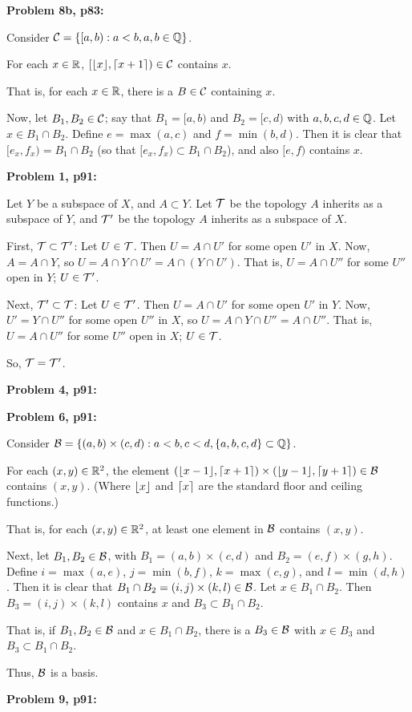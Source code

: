 \documentclass[a4paper,12pt]{article}
\begin{document}
\shunt

{\bf Problem 8b, p83:}

Consider $\mathcal{C} = \{[a,b): a<b, a, b \in \mathbb{Q}\}$.

For each $x \in \mathbb{R}$, $[\lfloor x\rfloor,\lceil x+1\rceil) \in \mathcal{C}$ contains $x$.

That is, for each $x \in \mathbb{R}$, there is a $B \in \mathcal{C}$ containing $x$.

Now, let $B_1, B_2 \in \mathcal{C}$; say that $B_1 = [a,b)$ and $B_2 = [c,d)$ with $a,b,c,d \in \mathbb{Q}$. Let $x \in B_1 \cap B_2$. Define $e = \max(a,c)$ and $f = \min(b,d)$. Then it is clear that $[e_x,f_x) = B_1 \cap B_2$ (so that $[e_x,f_x) \subset B_1 \cap B_2$), and also $[e,f)$ contains $x$. 


\shunt

{\bf Problem 1, p91:}

Let $Y$ be a subspace of $X$, and $A \subset Y$. Let $\mathcal{T}$ be the topology $A$ inherits as a subspace of $Y$, and $\mathcal{T}'$ be the topology $A$ inherits as a subspace of $X$.

First, $\mathcal{T} \subset \mathcal{T}'$: Let $U \in \mathcal{T}$. Then $U = A \cap U'$ for some open $U'$ in $X$. Now, $A = A \cap Y$, so $U = A \cap Y \cap U' = A \cap (Y \cap U')$. That is, $U = A \cap U''$ for some $U''$ open in $Y$; $U \in \mathcal{T}'$.

Next, $\mathcal{T}' \subset \mathcal{T}$: Let $U \in \mathcal{T}'$. Then $U = A \cap U'$ for some open $U'$ in $Y$. Now, $U' = Y \cap U''$ for some open $U''$ in $X$, so $U = A \cap Y \cap U'' = A \cap U''$. That is, $U = A \cap U''$ for some $U''$ open in $X$; $U \in \mathcal{T}$.

So, $\mathcal{T} = \mathcal{T}'$.

\shunt

{\bf Problem 4, p91:}


\shunt

{\bf Problem 6, p91:}

Consider $\mathcal{B}=\{(a,b) \times (c,d) : a<b, c<d, \{a,b,c,d\} \subset \mathbb{Q}\}$. 

For each $(x,y) \in \mathbb{R}^2$, the element $(\lfloor x-1\rfloor, \lceil x+1\rceil) \times (\lfloor y-1\rfloor,\lceil y+1\rceil) \in \mathcal{B}$ contains $(x,y)$. (Where $\lfloor x\rfloor$ and $\lceil x\rceil$ are the standard floor and ceiling functions.)

That is, for each $(x,y) \in \mathbb{R}^2$, at least one element in $\mathcal{B}$ contains $(x,y)$.

Next, let $B_1, B_2 \in \mathcal{B}$, with $B_1 =(a,b) \times (c,d)$ and $B_2 =(e,f) \times (g,h)$. Define $i = \max(a,e)$, $j = \min(b,f)$, $k =\max(c,g)$, and $l = \min(d,h)$. Then it is clear that $B_1 \cap B_2 = (i,j) \times (k,l) \in \mathcal{B}$.  Let $x \in B_1 \cap B_2$. Then $B_3 = (i,j) \times (k,l)$ contains $x$ and $B_3 \subset B_1 \cap B_2$.

That is, if $B_1, B_2 \in \mathcal{B}$ and $x \in B_1 \cap B_2$, there is a $B_3 \in \mathcal{B}$ with $x \in B_3$ and $B_3 \subset B_1 \cap B_2$.

Thus, $\mathcal{B}$ is a basis.

\shunt

{\bf Problem 9, p91:}

\shunt
\end{document}
